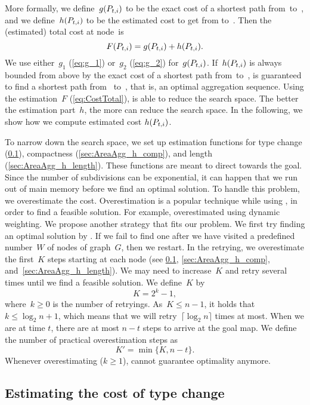 \documentclass[acmsmall,natbib=false]{acmart}
\begin{document}
More formally, we define~$g(P_{t,i})$ to be 
the exact cost of a shortest path from~\Pstart to~\Pnode, 
and we define~$h(P_{t,i})$ to be the estimated cost 
to get from \Pnode to~\Pgoal. 
Then the (estimated) total cost at node~\Pnode is
\begin{equation}
\label{eq:CostTotal}
F(P_{t,i})=g(P_{t,i})+h(P_{t,i}).
\end{equation}
We use either~$g_1$ (\eq\ref{eq:g_1}) 
or~$g_2$ (\eq\ref{eq:g_2})
for~$g(P_{t,i})$.
If~$h(P_{t,i})$ is always bounded from above 
by the exact cost of a shortest path from~\Pnode to~\Pgoal, 
\Astar is guaranteed to find a shortest path from~\Pstart 
to~\Pgoal, 
that is, an optimal aggregation sequence.  
Using the estimation~$F$ (\eq\ref{eq:CostTotal}), 
\Astar is able to reduce the search space.
The better the estimation part~$h$, 
the more \Astar can reduce the search space.
In the following, we show how we compute
estimated cost $h(P_{t,i})$.

To narrow down the search space, 
we set up estimation functions 
for type change (\sect\ref{sec:AreaAgg_h_type}), 
compactness (\sect\ref{sec:AreaAgg_h_comp}), 
and length (\sect\ref{sec:AreaAgg_h_length}). 
These functions are meant to direct \Astar towards the goal.
Since the number of subdivisions can be exponential, 
it can happen that we run out of main memory 
before we find an optimal solution. 
To handle this problem, we overestimate the cost. 
Overestimation is a popular technique while using \Astar,
in order to find a feasible solution. 
For example, \textcite{Pohl1973} overestimated 
using dynamic weighting. 
We propose another strategy that fits our problem. 
We first try finding an optimal solution by \Astar. 
If we fail to find one after 
we have visited a predefined number~$W$ of nodes of graph~$G$,
then we restart.
In the retrying, we overestimate the first~$K$ steps 
starting at each node
(see \sects\ref{sec:AreaAgg_h_type}, \ref{sec:AreaAgg_h_comp},
and~\ref{sec:AreaAgg_h_length}).
We may need to increase~$K$ and retry several times 
until we find a feasible solution.
We define~$K$ by
\[
K= 2^k -1,
\]
where~$k\ge 0$ is the number of retryings.
As~$K\le n-1$, it holds that~$k \le \log_2 n +1$, 
which means  that we will 
retry~$\lceil \log_2 n\rceil$ times at most.
When we are at time $t$, there are at most $n-t$ steps 
to arrive at the goal map.
We define the number of practical overestimation steps as
\[
K'= \min \{K, n-t\}.
\]
Whenever overestimating ($k\geq1$), 
\Astar cannot guarantee optimality anymore.


\subsection{Estimating the cost of type change}
\label{sec:AreaAgg_h_type}
\end{document}
